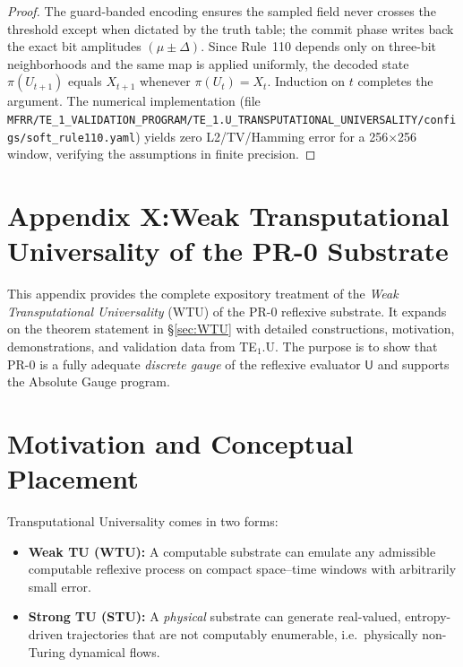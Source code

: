\begin{proof}
The guard-banded encoding ensures the sampled field never crosses the threshold except when dictated by the truth table; the commit phase writes back the exact bit amplitudes $(\mu\pm\Delta)$. Since Rule~110 depends only on three-bit neighborhoods and the same map is applied uniformly, the decoded state $\pi(U_{t+1})$ equals $X_{t+1}$ whenever $\pi(U_t)=X_t$. Induction on $t$ completes the argument. The numerical implementation (file \texttt{MFRR/TE\_1\_VALIDATION\_PROGRAM/TE\_1.U\_TRANSPUTATIONAL\_UNIVERSALITY/configs/soft\_rule110.yaml}) yields zero L2/TV/Hamming error for a 256×256 window, verifying the assumptions in finite precision.
\end{proof}


\appendix
\section*{Appendix X\;:\;Weak Transputational Universality of the PR-0 Substrate}
\label{appendix:WTU}

This appendix provides the complete expository treatment of the \emph{Weak
Transputational Universality} (WTU) of the PR-0 reflexive substrate.
It expands on the theorem statement in §\ref{sec:WTU} with detailed constructions,
motivation, demonstrations, and validation data from TE$_1$.U.
The purpose is to show that PR-0 is a fully adequate \emph{discrete gauge}
of the reflexive evaluator $\mathsf{U}$ and supports the Absolute Gauge program.

\section{Motivation and Conceptual Placement}

Transputational Universality comes in two forms:

\begin{itemize}
\item \textbf{Weak TU (WTU):} A computable substrate can emulate any admissible
      computable reflexive process on compact space--time windows with arbitrarily small error.
\item \textbf{Strong TU (STU):} A \emph{physical} substrate can generate
      real-valued, entropy-driven trajectories that are not computably enumerable,
      i.e.\ physically non-Turing dynamical flows.
\end{itemize}

